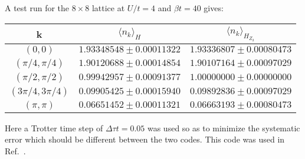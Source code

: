 A test run for the $8\times 8 $ lattice at $U/t = 4$ and $\beta t = 40$ gives:
\begin{center}
\begin{tabular}{@{} c c c @{}}
 \toprule
   k   &  $\langle n_k \rangle_{H} $  &  $\langle n_k \rangle_{H_{Z_2}} $ \\
  \midrule
   $(0,0)$                      & $1.93348548    \pm    0.00011322$  & $1.93336807   \pm      0.00080473$ \\
   $(\pi/4, \pi/4)$             & $1.90120688     \pm   0.00014854$  & $1.90107164    \pm     0.00097029$  \\
   $(\pi/2, \pi/2)$             & $0.99942957     \pm   0.00091377$  & $1.00000000    \pm     0.00000000$\\
   $(3\pi/4, 3\pi/4)$         &  $0.09905425     \pm   0.00015940$ & $0.09892836    \pm     0.00097029$ \\
   $(\pi,\pi)$                   & $0.06651452     \pm   0.00011321$  & $0.06663193     \pm    0.00080473$ \\
  \bottomrule
\end{tabular}

\end{center}
\vspace*{0.5cm}
Here a Trotter time step of  $\Delta \tau t = 0.05$ was used  so as to minimize the systematic error   which should be different  between the two codes.  This code  was used in Ref.~\cite{Hohenadler19}.






